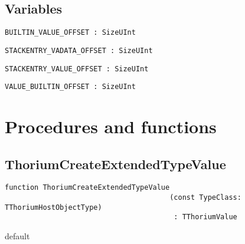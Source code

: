 \subsection{Variables}
\label{thoriumvariables}

\begin{verbatim}
BUILTIN_VALUE_OFFSET : SizeUInt
\end{verbatim}
\label{thoriumcore:thorium:builtinvalueoffset}



\begin{verbatim}
STACKENTRY_VADATA_OFFSET : SizeUInt
\end{verbatim}
\label{thoriumcore:thorium:stackentryvadataoffset}



\begin{verbatim}
STACKENTRY_VALUE_OFFSET : SizeUInt
\end{verbatim}
\label{thoriumcore:thorium:stackentryvalueoffset}



\begin{verbatim}
VALUE_BUILTIN_OFFSET : SizeUInt
\end{verbatim}
\label{thoriumcore:thorium:valuebuiltinoffset}


\section{Procedures and functions}
\label{thoriumfunctions}
\subsection{ThoriumCreateExtendedTypeValue}
\label{thoriumcore:thorium:thoriumcreateextendedtypevalue}
\begin{FPCList}
\Synopsis
\Declaration 

\begin{verbatim}
function ThoriumCreateExtendedTypeValue
                                       (const TypeClass: TThoriumHostObjectType)
                                        : TThoriumValue
\end{verbatim}
\Visibility
default
\Description
\Errors
\end{FPCList}
